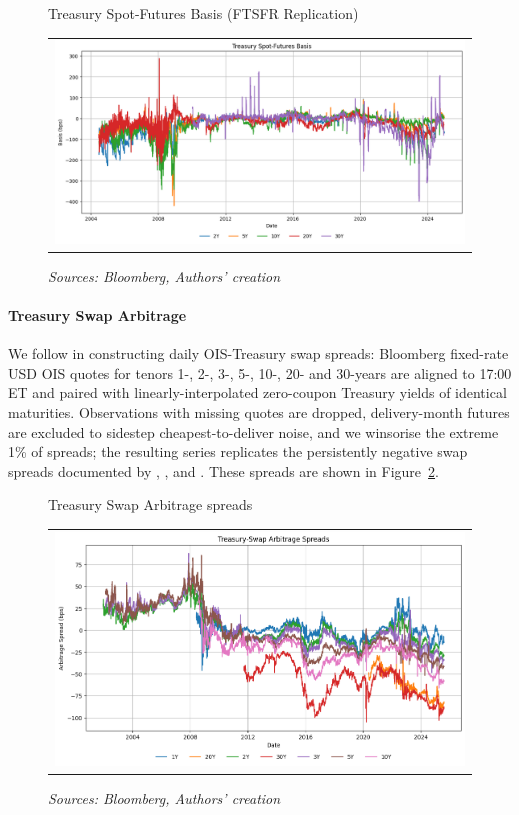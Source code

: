 \documentclass{article}
\begin{document}
\begin{figure}[h]
    \centering
    \caption{Treasury Spot-Futures Basis (FTSFR Replication)}
  \begin{tabular}{@{}c@{}}
    \includegraphics[width=.95\linewidth]{../docs_src/treasury_spot_futures_arbitrage.png}
  \end{tabular}
  \caption*{\emph{Sources: Bloomberg, Authors' creation}}
  \label{fig:treasury_sf_basis}
\end{figure}


\paragraph{Treasury Swap Arbitrage}
We follow \citet{Siriwardane2021} in constructing daily OIS-Treasury swap
spreads: Bloomberg fixed-rate USD OIS quotes for tenors 1-, 2-, 3-, 5-, 10-, 20-
and 30-years are aligned to 17:00 ET and paired with linearly-interpolated
zero-coupon Treasury yields of identical maturities.  Observations with missing
quotes are dropped, delivery-month futures are excluded to sidestep
cheapest-to-deliver noise, and we winsorise the extreme 1\% of spreads; the
resulting series replicates the persistently negative swap spreads documented by
\citet{Jermann2020}, \citet{Du2023}, and \citet{Hanson2023}.
These spreads are shown in Figure~\ref{fig:treasury_swap_arbitrage}.

\begin{figure}[h]
  \centering
  \caption{Treasury Swap Arbitrage spreads}
  \begin{tabular}{@{}c@{}}
    \includegraphics[width=.95\linewidth]{../docs_src/treasury_swap_arbitrage_spreads.png}
  \end{tabular}
  \caption*{\emph{Sources: Bloomberg, Authors' creation}}
  \label{fig:treasury_swap_arbitrage}
\end{figure}
\end{document}
